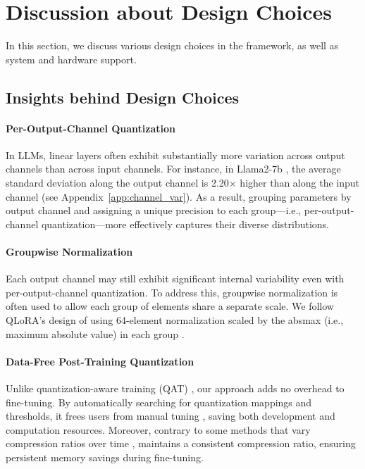 \section{Discussion about Design Choices} \label{sec:design}


In this section, we discuss various design choices in the \FWName framework, as well as system and hardware support. 

\subsection{Insights behind \FWName{} Design Choices} \label{sec:designchoices}


\paragraph{Per-Output-Channel Quantization} 
In LLMs, linear layers often exhibit substantially more variation across output channels than across input channels. For instance, in Llama2-7b \cite{touvron2023llama}, the average standard deviation along the output channel is 2.20× higher than along the input channel (see Appendix~\ref{app:channel_var}). As a result, grouping parameters by output channel and assigning a unique precision to each group—i.e., per-output-channel quantization—more effectively captures their diverse distributions.

\paragraph{Groupwise Normalization} 
Each output channel may still exhibit significant internal variability even with per-output-channel quantization. 
To address this, groupwise normalization is often used to allow each group of elements share a separate scale. 
We follow QLoRA's design of using 64-element normalization scaled by the absmax (i.e., maximum absolute value) in each group \cite{dettmers2024qlora}. \label{sec:groupnorm}

\paragraph{Data-Free Post-Training Quantization} Unlike quantization-aware training (QAT) \cite{esser2019learned,yang2021bsq,jeon2024l4q,savarese2022not}, our approach adds no overhead to fine-tuning. By automatically searching for quantization mappings and thresholds, it frees users from manual tuning \cite{savarese2022not,zhou2023sysmol}, saving both development and computation resources. Moreover, contrary to some methods that vary compression ratios over time \cite{savarese2022not,yang2021bsq}, \FWName maintains a consistent compression ratio, ensuring persistent memory savings during fine-tuning. 

